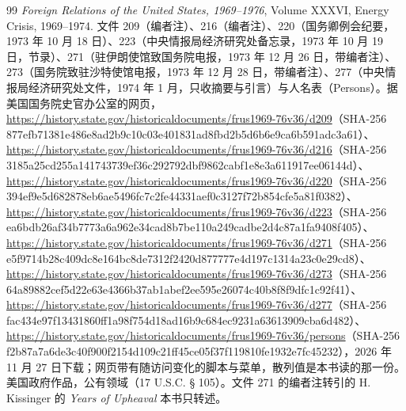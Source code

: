 \begin{thebibliography}{99}
 \emph{Foreign Relations of the United States, 1969--1976}, Volume XXXVI, Energy Crisis, 1969--1974. 文件 209（编者注）、216（编者注）、220（国务卿例会纪要，1973 年 10 月 18 日）、223（中央情报局经济研究处备忘录，1973 年 10 月 19 日，节录）、271（驻伊朗使馆致国务院电报，1973 年 12 月 26 日，带编者注）、273（国务院致驻沙特使馆电报，1973 年 12 月 28 日，带编者注）、277（中央情报局经济研究处文件，1974 年 1 月，只收摘要与引言）与人名表（Persons）。据美国国务院史官办公室的网页，\url{https://history.state.gov/historicaldocuments/frus1969-76v36/d209}（SHA-256 877efb71381e486e8ad2b9c10c03e401831ad8fbd2b5d6b6e9ca6b591adc3a61）、\url{https://history.state.gov/historicaldocuments/frus1969-76v36/d216}（SHA-256 3185a25cd255a141743739ef36c292792dbf9862cabf1e8e3a611917ee06144d）、\url{https://history.state.gov/historicaldocuments/frus1969-76v36/d220}（SHA-256 394ef9e5d682878eb6ae5496fc7c2fe44331aef0c3127f72b854cfe5a81f0382）、\url{https://history.state.gov/historicaldocuments/frus1969-76v36/d223}（SHA-256 ea6bdb26af34b7773a6a962e34cad8b7be110a249cadbe2d4c87a1fa9408f405）、\url{https://history.state.gov/historicaldocuments/frus1969-76v36/d271}（SHA-256 e5f9714b28c409dc8e164bc8de7312f2420d877777e4d197c1314a23c0e29cd8）、\url{https://history.state.gov/historicaldocuments/frus1969-76v36/d273}（SHA-256 64a89882cef5d22e63e4366b37ab1abef2ee595e26074c40b8f8f9dfc1c92f41）、\url{https://history.state.gov/historicaldocuments/frus1969-76v36/d277}（SHA-256 fac434e97f13431860ff1a98f754d18ad16b9c684ec9231a63613909cba6d482）、\url{https://history.state.gov/historicaldocuments/frus1969-76v36/persons}（SHA-256 f2b87a7a6de3c40f900f2154d109c21ff45ce05f37f119810fe1932e7fc45232），2026 年 11 月 27 日下载；网页带有随访问变化的脚本与菜单，散列值是本书读的那一份。美国政府作品，公有领域（17 U.S.C. § 105）。文件 271 的编者注转引的 H. Kissinger 的 \emph{Years of Upheaval} 本书只转述。


\end{thebibliography}
